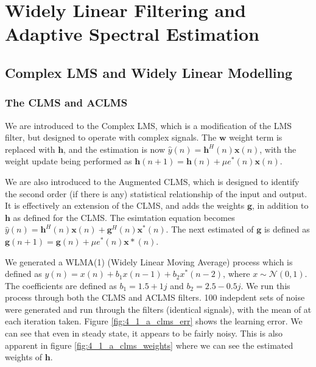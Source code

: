 \documentclass[./main.tex]{subfiles}
\begin{document}
\section{Widely Linear Filtering and Adaptive Spectral Estimation}

\subsection{Complex LMS and Widely Linear Modelling}

\subsubsection{The CLMS and ACLMS}
We are introduced to the Complex LMS, which is a modification of the LMS filter, but designed to operate with complex signals. The $ \mathbf{w}$ weight term is replaced with $ \mathbf{h}$, and the estimation is now $ \hat{y}(n) = \mathbf{h}^H(n) \mathbf{x}(n) $, with the weight update being performed as $ \mathbf{h}(n+1) = \mathbf{h}(n) + \mu e^{\ast}(n)\mathbf{x}(n) $.

We are also introduced to the Augmented CLMS, which is designed to identify the second order (if there is any) statistical relationship of the input and output. It is effectively an extension of the CLMS, and adds the weights $ \mathbf{g}$, in addition to $ \mathbf{h}$ as defined for the CLMS. The esimtation equation becomes  $ \hat{y}(n) = \mathbf{h}^H(n) \mathbf{x}(n) + \mathbf{g}^H(n) \mathbf{x}^\ast(n) $. The next estimated of $ \mathbf{g}$ is defined as $ \mathbf{g}(n+1) = \mathbf{g}(n) + \mu e^{\ast}(n)\mathbf{x}\ast(n) $.

We generated a WLMA(1) (Widely Linear Moving Average) process which is defined as $ y(n) = x(n) + b_1 x(n-1) + b_2 x^{\ast}(n-2) $, where $ x \sim \mathcal{N} (0,1) $. The coefficients are defined as $ b_1 = 1.5 + 1j $ and $ b_2 = 2.5 - 0.5j$. We run this process through both the CLMS and ACLMS filters. 100 indepdent sets of noise were generated and run through the filters (identical signals), with the mean of at each iteration taken. Figure \ref{fig:4_1_a_clms_err} shows the learning error. We can see that even in steady state, it appears to be fairly noisy. This is also apparent in figure \ref{fig:4_1_a_clms_weights} where we can see the estimated weights of $\mathbf{h}$.
\end{document}
